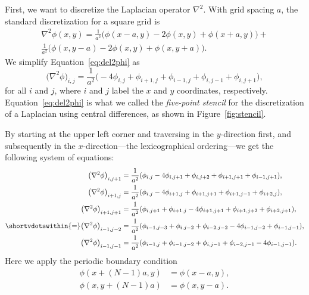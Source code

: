 First, we want to discretize the Laplacian operator \(\nabla^2\).
With grid spacing \(a\), the standard discretization for a square grid is
%
\begin{multline}\label{eq:del2phi}
    \nabla^2 \phi(x, y) =
    \frac{ 1 }{ a^2 } \bigl(\phi(x - a, y) - 2 \phi(x, y) + \phi(x + a, y)\bigr) +\\
    \frac{ 1 }{ a^2 } \bigl(\phi(x, y - a) - 2 \phi(x, y) + \phi(x, y + a)\bigr).
\end{multline}
%
We simplify Equation~\eqref{eq:del2phi} as
%
\begin{equation}\label{eq:del2phisim}
    \bigl(\nabla^2 \phi\bigr)_{i, j} = \frac{1}{a^2} \bigl(
    -4 \phi_{i, j} + \phi_{i+1, j} + \phi_{i-1, j} + \phi_{i, j-1} + \phi_{i, j+1}
    \bigr),
\end{equation}
%
for all \(i\) and \(j\),
where \(i\) and \(j\) label the \(x\) and \(y\) coordinates, respectively.
Equation~\eqref{eq:del2phi} is what we called the \emph{five-point stencil}
for the discretization of a Laplacian using central differences,
as shown in Figure~\ref{fig:stencil}.



By starting at the upper left corner and traversing in the \(y\)-direction first, and
subsequently in the \(x\)-direction---the lexicographical ordering---we get the following
system of equations:
%
\begin{align}
    \bigl(\nabla^2 \phi\bigr)_{i, j+1}   & = \frac{1}{a^2} (
    \phi_{i, j} - 4\phi_{i, j+1} + \phi_{i, j+2} + \phi_{i+1, j+1} + \phi_{i-1, j+1}
    ),                                                       \\
    \bigl(\nabla^2 \phi\bigr)_{i+1, j}   & = \frac{1}{a^2} (
    \phi_{i, j} - 4\phi_{i+1, j} + \phi_{i+1, j+1} + \phi_{i+1, j-1} + \phi_{i+2, j}
    ),                                                       \\
    \bigl(\nabla^2 \phi\bigr)_{i+1, j+1} & = \frac{1}{a^2} (
    \phi_{i, j+1} + \phi_{i+1, j} - 4\phi_{i+1, j+1} + \phi_{i+1, j+2} + \phi_{i+2, j+1}
    ),                                                       \\
    \shortvdotswithin{=} %
    \bigl(\nabla^2 \phi\bigr)_{i-1, j-2} & = \frac{1}{a^2} (
    \phi_{i-1, j-3} + \phi_{i, j-2} + \phi_{i-2, j-2} - 4\phi_{i-1, j-2} + \phi_{i-1, j-1}
    ),                                                       \\
    \bigl(\nabla^2 \phi\bigr)_{i-1, j-1} & = \frac{1}{a^2} (
    \phi_{i-1, j} + \phi_{i-1, j-2} + \phi_{i, j-1} + \phi_{i-2, j-1} - 4\phi_{i-1, j-1}
    ).\label{eq:delend}
\end{align}
%
Here we apply the periodic boundary condition
%
\begin{align}
    \phi(x + (N-1)a, y) & = \phi(x - a, y), \\
    \phi(x, y + (N-1)a) & = \phi(x, y - a).
\end{align}

